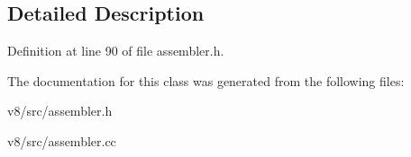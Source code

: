 \subsection{Detailed Description}


Definition at line 90 of file assembler.\+h.



The documentation for this class was generated from the following files\+:\begin{DoxyCompactItemize}
\item 
v8/src/assembler.\+h\item 
v8/src/assembler.\+cc\end{DoxyCompactItemize}
